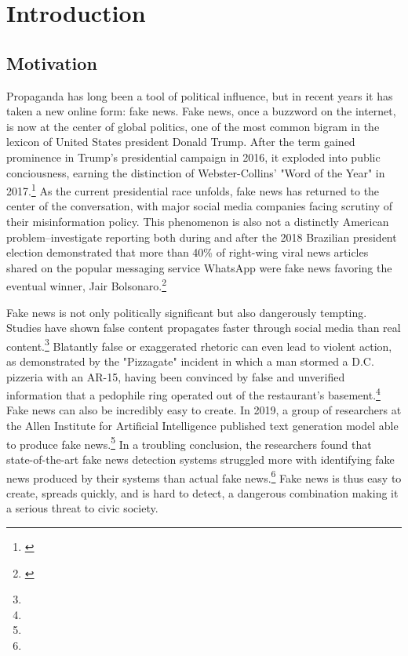 \documentclass[../thesis.tex]{subfiles}
\begin{document}
\chapter{Introduction}
\label{ch:intro}

\section{Motivation}
Propaganda has long been a tool of political influence, but in recent years it has taken a new online form: fake news. Fake news, once a buzzword on the internet, is now at the center of global politics, one of the most common bigram in the lexicon of United States president Donald Trump. After the term gained prominence in Trump's presidential campaign in 2016, it exploded into public conciousness, earning the distinction of Webster-Collins' "Word of the Year" in 2017.\footnote{\cite{Webster}} As the current presidential race unfolds, fake news has returned to the center of the conversation, with major social media companies facing scrutiny of their misinformation policy. This phenomenon is also not a distinctly American problem--investigate reporting both during and after the 2018 Brazilian president election demonstrated that more than 40\% of right-wing viral news articles shared on the popular messaging service WhatsApp were fake news favoring the eventual winner, Jair Bolsonaro.\footnote{\cite{Bolsonaro}}
	
	Fake news is not only politically significant but also dangerously tempting. Studies have shown false content propagates faster through social media than real content.\footnote{} Blatantly false or exaggerated rhetoric can even lead to violent action, as demonstrated by the "Pizzagate" incident in which a man stormed a D.C. pizzeria with an AR-15, having been convinced by false and unverified information that a pedophile ring operated out of the restaurant's basement.\footnote{} Fake news can also be incredibly easy to create. In 2019, a group of researchers at the Allen Institute for Artificial Intelligence published text generation model able to produce fake news.\footnote{} In a troubling conclusion, the researchers found that state-of-the-art fake news detection systems struggled more with identifying fake news produced by their systems than actual fake news.\footnote{} Fake news is thus easy to create, spreads quickly, and is hard to detect, a dangerous combination making it a serious threat to civic society.
\end{document}
